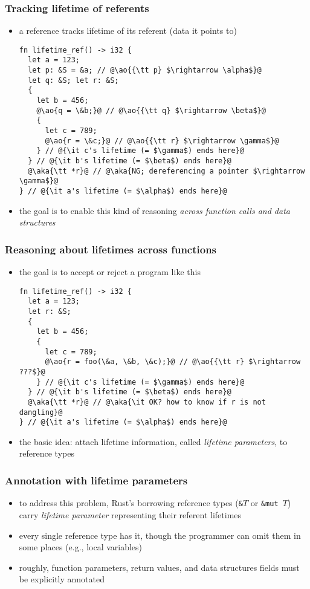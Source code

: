 \documentclass[12pt,dvipdfmx]{beamer}
\newcommand{\ao}[1]{{\color{blue}#1}}
\newcommand{\aka}[1]{{\color{red}#1}}
\begin{document}
\begin{frame}[fragile]
  \frametitle{Tracking lifetime of referents}
  \begin{itemize}
  \item a reference tracks lifetime of its referent (data it points to)
\begin{lstlisting}
fn lifetime_ref() -> i32 {
  let a = 123;
  let p: &S = &a; // @\ao{{\tt p} $\rightarrow \alpha$}@
  let q: &S; let r: &S;
  {
    let b = 456;
    @\ao{q = \&b;}@ // @\ao{{\tt q} $\rightarrow \beta$}@
    {
      let c = 789;
      @\ao{r = \&c;}@ // @\ao{{\tt r} $\rightarrow \gamma$}@
    } // @{\it c's lifetime (= $\gamma$) ends here}@
  } // @{\it b's lifetime (= $\beta$) ends here}@
  @\aka{\tt *r}@ // @\aka{NG; dereferencing a pointer $\rightarrow \gamma$}@
} // @{\it a's lifetime (= $\alpha$) ends here}@
\end{lstlisting}

\item the goal is to enable this kind of reasoning
  {\it across function calls and data structures}
\end{itemize}
\end{frame}

\begin{frame}[fragile]
  \frametitle{Reasoning about lifetimes across functions}
  \begin{itemize}
  \item the goal is to accept or reject a program like this
\begin{lstlisting}
fn lifetime_ref() -> i32 {
  let a = 123;
  let r: &S;
  {
    let b = 456;
    {
      let c = 789;
      @\ao{r = foo(\&a, \&b, \&c);}@ // @\ao{{\tt r} $\rightarrow ???$}@
    } // @{\it c's lifetime (= $\gamma$) ends here}@
  } // @{\it b's lifetime (= $\beta$) ends here}@
  @\aka{\tt *r}@ // @\aka{\it OK? how to know if r is not dangling}@
} // @{\it a's lifetime (= $\alpha$) ends here}@
\end{lstlisting}
\item the basic idea: attach lifetime information, called
  \ao{\it lifetime parameters}, to reference types
\end{itemize}
\end{frame}

\begin{frame}
  \frametitle{Annotation with lifetime parameters}
  \begin{itemize}
  \item to address this problem,
    Rust's borrowing reference types ({\tt \&$T$} or {\tt \&mut $T$})
    carry \ao{\it lifetime parameter} representing their referent lifetimes
  \item every single reference type has it, though
    the programmer can omit them in some places (e.g., local variables)
  \item roughly, function parameters, return values, and
    data structures fields must be explicitly annotated 
  \end{itemize}
\end{frame}
\fi
\end{document}
